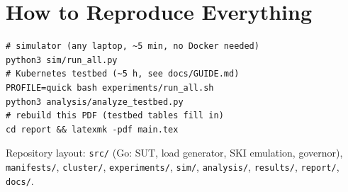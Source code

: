 \documentclass[conference]{IEEEtran}
\begin{document}
\section{How to Reproduce Everything}
\label{app:run}
\footnotesize
\begin{verbatim}
# simulator (any laptop, ~5 min, no Docker needed)
python3 sim/run_all.py
# Kubernetes testbed (~5 h, see docs/GUIDE.md)
PROFILE=quick bash experiments/run_all.sh
python3 analysis/analyze_testbed.py
# rebuild this PDF (testbed tables fill in)
cd report && latexmk -pdf main.tex
\end{verbatim}
Repository layout: \texttt{src/} (Go: SUT, load generator, SKI
emulation, governor), \texttt{manifests/}, \texttt{cluster/},
\texttt{experiments/}, \texttt{sim/}, \texttt{analysis/},
\texttt{results/}, \texttt{report/}, \texttt{docs/}.

\normalsize


\end{document}
